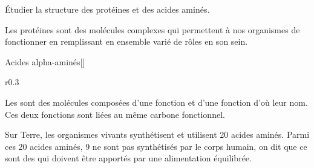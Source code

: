 \tetePremStssBiol
\vspace*{-36pt}

\begin{objectifs}
  \item Étudier la structure des protéines et des acides aminés.
\end{objectifs}

\begin{contexte}
  Les protéines sont des molécules complexes qui permettent à nos organismes de fonctionner en remplissant en ensemble varié de rôles en son sein.

\end{contexte}


\begin{doc}{Acides alpha-aminés}[\label{doc:acides_amines}]
  \vspace*{-24pt}
  \begin{wrapfigure}{r}{0.3\linewidth}
    \centering
    \vspace*{-13pt}
  \end{wrapfigure}
  \phantom{b}
  
  \begin{importants}
    Les  sont des molécules composées d'une fonction  et d'une fonction  d'où leur nom.
    Ces deux fonctions sont liées au même carbone fonctionnel.
  \end{importants}
  
  Sur Terre, les organismes vivants synthétisent et utilisent 20 acides aminés.
  Parmi ces 20 acides aminés, 9 ne sont pas synthétisés par le corps humain, on dit que ce sont des  qui doivent être apportés par une alimentation équilibrée.
\end{doc}


